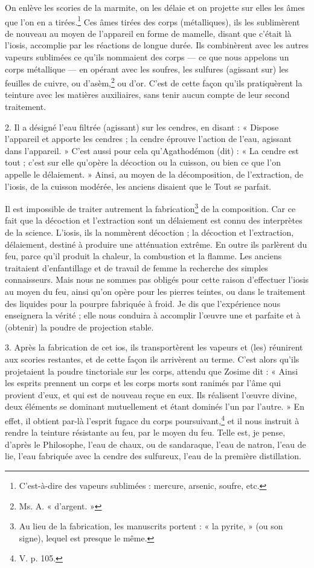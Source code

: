 \documentclass[landscape, a4paper, 11pt, oneside, polutonikogreek, french]{article}
\begin{document}
On enlève les scories de la marmite, on les délaie et on projette sur elles les âmes que l'on en a tirées.\footnote{C'est-à-dire des vapeurs sublimées : mercure, arsenic, soufre, etc.} Ces âmes tirées des corps (métalliques), ils les sublimèrent de nouveau au moyen de l'appareil en forme de mamelle, disant que c'était là l'iosis, accomplie par les réactions de longue durée. Ils combinèrent avec les autres vapeurs sublimées ce qu'ils nommaient des corps --- ce que nous appelons un corps métallique --- en opérant avec les soufres, les sulfures (agissant sur) les feuilles de cuivre, ou d'asèm,\footnote{Ms. A. « d'argent. »} ou d'or. C'est de cette façon qu'ils pratiquèrent la teinture avec les matières auxiliaires, sans tenir aucun compte de leur second traitement.

2. Il a désigné l'eau filtrée (agissant) sur les cendres, en disant : « Dispose l'appareil et apporte les cendres ; la cendre éprouve l'action de l'eau, agissant dans l'appareil. » C'est aussi pour cela qu'Agathodémon (dit) : « La cendre est tout ; c'est sur elle qu'opère la décoction ou la cuisson, ou bien ce que l'on appelle le délaiement. » Ainsi, au moyen de la décomposition, de l'extraction, de l'iosis, de la cuisson modérée, les anciens disaient que le Tout se parfait.

Il est impossible de traiter autrement la fabrication\footnote{Au lieu de la fabrication, les manuscrits portent : « la pyrite, » (ou son signe), lequel est presque le même.} de la composition. Car ce fait que la décoction et l'extraction sont un délaiement est connu des interprètes de la science. L'iosis, ils la nommèrent décoction ; la décoction et l'extraction, délaiement, destiné à produire une atténuation extrême. En outre ils parlèrent du feu, parce qu'il produit la chaleur, la combustion et la flamme. Les anciens traitaient d'enfantillage et de travail de femme la recherche des simples connaisseurs. Mais nous ne sommes pas obligés pour cette raison d'effectuer l'iosis au moyen du feu, ainsi qu'on opère pour les pierres teintes, ou dans le traitement des liquides pour la pourpre fabriquée à froid. Je dis que l'expérience nous enseignera la vérité ; elle nous conduira à accomplir l'œuvre une et parfaite et à (obtenir) la poudre de projection stable.

3. Après la fabrication de cet ios, ils transportèrent les vapeurs et (les) réunirent aux scories restantes, et de cette façon ils arrivèrent au terme. C'est alors qu'ils projetaient la poudre tinctoriale sur les corps, attendu que Zosime dit : « Ainsi les esprits prennent un corps et les corps morts sont ranimés par l'âme qui provient d'eux, et qui est de nouveau reçue en eux. Ils réalisent l'œuvre divine, deux éléments se dominant mutuellement et étant dominés l'un par l'autre. » En effet, il obtient par-là l'esprit fugace du corps poursuivant,\footnote{V. p. 105.} et il nous instruit à rendre la teinture résistante au feu, par le moyen du feu. Telle est, je pense, d'après le Philosophe, l'eau de chaux, ou de sandaraque, l'eau de natron, l'eau de lie, l'eau fabriquée avec la cendre des sulfureux, l'eau de la première distillation.
\end{document}
